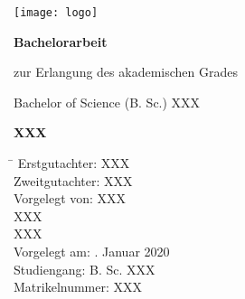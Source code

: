 \begin{center}

\texttt{[image: logo]}

\vfill

\Large{\textbf{Bachelorarbeit}}

\vspace{2mm}

\normalsize{zur Erlangung des akademischen Grades}

\normalsize{Bachelor of Science (B. Sc.) XXX}

\vspace{1cm}

\Large{\textbf{XXX}}

\vfill

\parbox{1cm}
{
\begin{normalsize}
\begin{tabbing}
\hspace{5cm} \= \kill
Erstgutachter: \> XXX \\
Zweitgutachter: \> XXX \\[3mm]
Vorgelegt von: \> XXX \\
\> XXX \\
\> XXX \\[3mm]
Vorgelegt am: . Januar 2020 \\
Studiengang: \> B. Sc. XXX \\
Matrikelnummer: \> XXX
\end{tabbing}
\end{normalsize}
}

\end{center}
